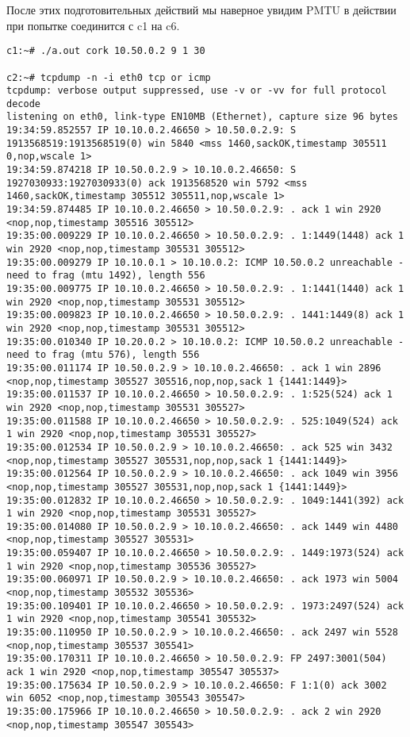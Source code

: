 \documentclass[a4paper,12pt]{article}
\begin{document}
После этих подготовительных действий мы наверное увидим PMTU в действии при попытке соединится с c1 на c6.

\begin{lstlisting}
c1:~# ./a.out cork 10.50.0.2 9 1 30

c2:~# tcpdump -n -i eth0 tcp or icmp
tcpdump: verbose output suppressed, use -v or -vv for full protocol decode
listening on eth0, link-type EN10MB (Ethernet), capture size 96 bytes
19:34:59.852557 IP 10.10.0.2.46650 > 10.50.0.2.9: S 1913568519:1913568519(0) win 5840 <mss 1460,sackOK,timestamp 305511 0,nop,wscale 1>
19:34:59.874218 IP 10.50.0.2.9 > 10.10.0.2.46650: S 1927030933:1927030933(0) ack 1913568520 win 5792 <mss 1460,sackOK,timestamp 305512 305511,nop,wscale 1>
19:34:59.874485 IP 10.10.0.2.46650 > 10.50.0.2.9: . ack 1 win 2920 <nop,nop,timestamp 305516 305512>
19:35:00.009229 IP 10.10.0.2.46650 > 10.50.0.2.9: . 1:1449(1448) ack 1 win 2920 <nop,nop,timestamp 305531 305512>
19:35:00.009279 IP 10.10.0.1 > 10.10.0.2: ICMP 10.50.0.2 unreachable - need to frag (mtu 1492), length 556
19:35:00.009775 IP 10.10.0.2.46650 > 10.50.0.2.9: . 1:1441(1440) ack 1 win 2920 <nop,nop,timestamp 305531 305512>
19:35:00.009823 IP 10.10.0.2.46650 > 10.50.0.2.9: . 1441:1449(8) ack 1 win 2920 <nop,nop,timestamp 305531 305512>
19:35:00.010340 IP 10.20.0.2 > 10.10.0.2: ICMP 10.50.0.2 unreachable - need to frag (mtu 576), length 556
19:35:00.011174 IP 10.50.0.2.9 > 10.10.0.2.46650: . ack 1 win 2896 <nop,nop,timestamp 305527 305516,nop,nop,sack 1 {1441:1449}>
19:35:00.011537 IP 10.10.0.2.46650 > 10.50.0.2.9: . 1:525(524) ack 1 win 2920 <nop,nop,timestamp 305531 305527>
19:35:00.011588 IP 10.10.0.2.46650 > 10.50.0.2.9: . 525:1049(524) ack 1 win 2920 <nop,nop,timestamp 305531 305527>
19:35:00.012534 IP 10.50.0.2.9 > 10.10.0.2.46650: . ack 525 win 3432 <nop,nop,timestamp 305527 305531,nop,nop,sack 1 {1441:1449}>
19:35:00.012564 IP 10.50.0.2.9 > 10.10.0.2.46650: . ack 1049 win 3956 <nop,nop,timestamp 305527 305531,nop,nop,sack 1 {1441:1449}>
19:35:00.012832 IP 10.10.0.2.46650 > 10.50.0.2.9: . 1049:1441(392) ack 1 win 2920 <nop,nop,timestamp 305531 305527>
19:35:00.014080 IP 10.50.0.2.9 > 10.10.0.2.46650: . ack 1449 win 4480 <nop,nop,timestamp 305527 305531>
19:35:00.059407 IP 10.10.0.2.46650 > 10.50.0.2.9: . 1449:1973(524) ack 1 win 2920 <nop,nop,timestamp 305536 305527>
19:35:00.060971 IP 10.50.0.2.9 > 10.10.0.2.46650: . ack 1973 win 5004 <nop,nop,timestamp 305532 305536>
19:35:00.109401 IP 10.10.0.2.46650 > 10.50.0.2.9: . 1973:2497(524) ack 1 win 2920 <nop,nop,timestamp 305541 305532>
19:35:00.110950 IP 10.50.0.2.9 > 10.10.0.2.46650: . ack 2497 win 5528 <nop,nop,timestamp 305537 305541>
19:35:00.170311 IP 10.10.0.2.46650 > 10.50.0.2.9: FP 2497:3001(504) ack 1 win 2920 <nop,nop,timestamp 305547 305537>
19:35:00.175634 IP 10.50.0.2.9 > 10.10.0.2.46650: F 1:1(0) ack 3002 win 6052 <nop,nop,timestamp 305543 305547>
19:35:00.175966 IP 10.10.0.2.46650 > 10.50.0.2.9: . ack 2 win 2920 <nop,nop,timestamp 305547 305543>


\end{lstlisting}
\end{document}
